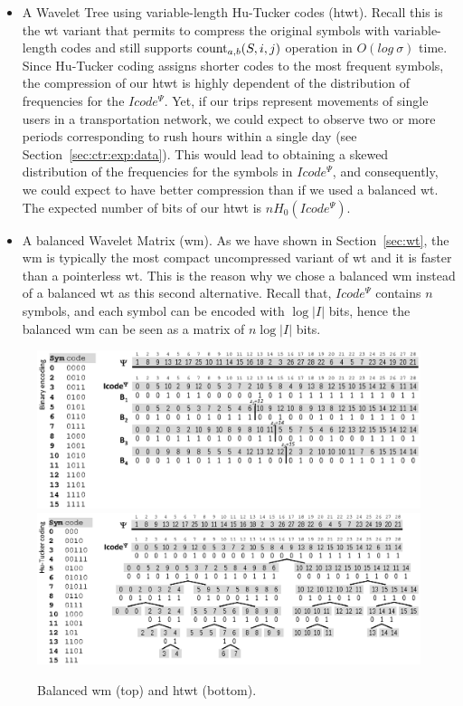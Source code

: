	\begin{itemize}
	  \item A Wavelet Tree using variable-length Hu-Tucker codes (\gls{htwt}).
	  Recall this is the \gls{wt} variant that permits to compress the original symbols with \mbox{variable-length} codes and 
	  still supports $\operatorname{count}_{a,b}(S,i,j)$ operation in $O(log~\sigma)$ time. Since Hu-Tucker coding assigns shorter codes
	  to the most frequent symbols, the compression of our \gls{htwt} is highly dependent of the distribution
	  of frequencies for the $Icode^{\Psi}$. Yet, if our 
	  trips represent movements of single users in a transportation network, we could expect to observe two or more periods 
	  corresponding to rush hours within a single day (see Section~\ref{sec:ctr:exp:data}). This would lead to obtaining a skewed distribution of the frequencies 
	  for the symbols in $Icode^{\Psi}$, and consequently, we could expect to have better compression than if we used a 
	  balanced \gls{wt}. The expected number of bits of our \gls{htwt} is $nH_0(Icode^{\Psi})$.

	  \item A balanced Wavelet Matrix (\gls{wm}). As we have shown in Section~\ref{sec:wt}, the \gls{wm} is typically the most
	  compact uncompressed variant of \gls{wt} and it is faster than a pointerless \gls{wt}. This is the reason why we chose
	  a balanced \gls{wm} instead of a balanced \gls{wt} as this second alternative. Recall that, $Icode^{\Psi}$ contains $n$ symbols, 
	  and each symbol can be encoded with $\log  |I|$ bits, hence the 
	  balanced \gls{wm} can be seen as a matrix of $n  \log|I|$ bits.
	\end{itemize}
	
	\begin{figure}[ht]
		\begin{center}
			{\includegraphics[width=1.0\textwidth]{figures/wma.eps}}
			{\includegraphics[width=1.0\textwidth]{figures/wta.eps}}
		\end{center}
		\caption{Balanced \acrshort{wm} (top) and \acrshort{htwt} (bottom).}
		\label{fig:wtwm}
	\end{figure}


